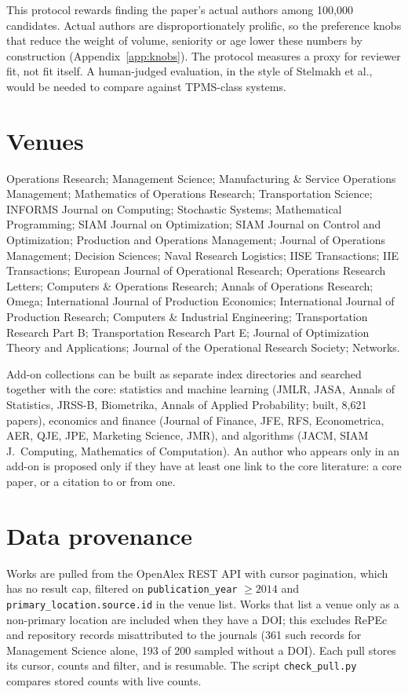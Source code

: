 \documentclass[11pt]{article}
\begin{document}
This protocol rewards finding the paper's actual authors among 100{,}000 candidates. Actual authors are disproportionately prolific, so the preference knobs that reduce the weight of volume, seniority or age lower these numbers by construction (Appendix~\ref{app:knobs}). The protocol measures a proxy for reviewer fit, not fit itself. A human-judged evaluation, in the style of Stelmakh et al., would be needed to compare against TPMS-class systems.

\appendix
\section{Venues}\label{app:venues}
Operations Research; Management Science; Manufacturing \& Service Operations Management; Mathematics of Operations Research; Transportation Science; INFORMS Journal on Computing; Stochastic Systems; Mathematical Programming; SIAM Journal on Optimization; SIAM Journal on Control and Optimization; Production and Operations Management; Journal of Operations Management; Decision Sciences; Naval Research Logistics; IISE Transactions; IIE Transactions; European Journal of Operational Research; Operations Research Letters; Computers \& Operations Research; Annals of Operations Research; Omega; International Journal of Production Economics; International Journal of Production Research; Computers \& Industrial Engineering; Transportation Research Part B; Transportation Research Part E; Journal of Optimization Theory and Applications; Journal of the Operational Research Society; Networks.

Add-on collections can be built as separate index directories and searched together with the core: statistics and machine learning (JMLR, JASA, Annals of Statistics, JRSS-B, Biometrika, Annals of Applied Probability; built, 8{,}621 papers), economics and finance (Journal of Finance, JFE, RFS, Econometrica, AER, QJE, JPE, Marketing Science, JMR), and algorithms (JACM, SIAM J.\ Computing, Mathematics of Computation). An author who appears only in an add-on is proposed only if they have at least one link to the core literature: a core paper, or a citation to or from one.

\section{Data provenance}\label{app:data}
Works are pulled from the OpenAlex REST API with cursor pagination, which has no result cap, filtered on \texttt{publication\_year} $\ge 2014$ and \texttt{primary\_location.source.id} in the venue list. Works that list a venue only as a non-primary location are included when they have a DOI; this excludes RePEc and repository records misattributed to the journals (361 such records for Management Science alone, 193 of 200 sampled without a DOI). Each pull stores its cursor, counts and filter, and is resumable. The script \texttt{check\_pull.py} compares stored counts with live counts.
\end{document}

